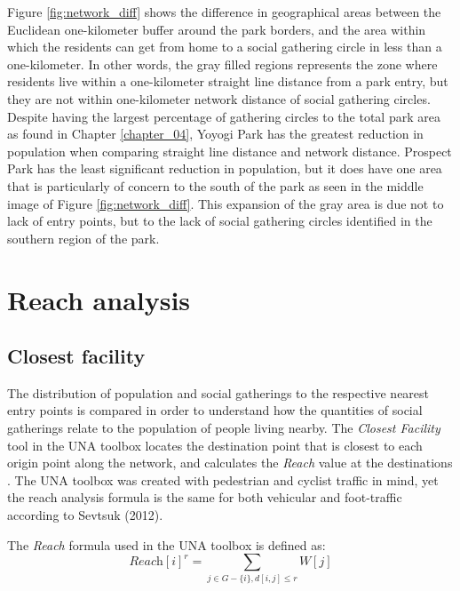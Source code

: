 \begin{multicols}{2}
Figure \ref{fig:network_diff} shows the difference in geographical areas between the Euclidean one-kilometer buffer around the park borders, and the area within which the residents can get from home to a social gathering circle in less than a one-kilometer. In other words, the gray filled regions represents the zone where residents live within a one-kilometer straight line distance from a park entry, but they are not within one-kilometer network distance of social gathering circles. Despite having the largest percentage of gathering circles to the total park area as found in Chapter \ref{chapter_04}, Yoyogi Park has the greatest reduction in population when comparing straight line distance and network distance. Prospect Park has the least significant reduction in population, but it does have one area that is particularly of concern to the south of the park as seen in the middle image of Figure \ref{fig:network_diff}. This expansion of the gray area is due not to lack of entry points, but to the lack of social gathering circles identified in the southern region of the park.

\section{Reach analysis}
\subsection{Closest facility}
The distribution of population and social gatherings to the respective nearest entry points is compared in order to understand how the quantities of social gatherings relate to the population of people living nearby. The \textit{Closest Facility} tool in the UNA toolbox locates the destination point that is closest to each origin point along the network, and calculates the \textit{Reach} value at the destinations \cite{sevtsuk_urban_2012}. The UNA toolbox was created with pedestrian and cyclist traffic in mind, yet the reach analysis formula is the same for both vehicular and foot-traffic according to Sevtsuk (2012). 

The \textit{Reach} formula used in the UNA toolbox is defined as:\\

\begin{equation}
        \textit{Reach}[\textit{i}]^{\textit{r}} = \sum_{\textit{j}\in\textit{G}-\{\textit{i}\},\textit{d}[\textit{i},\textit{j}]\le\textit{r}} \textit{W}[\textit{j}]
        \label{eqn:simple_eqn}
\end{equation} \\


\end{multicols}
